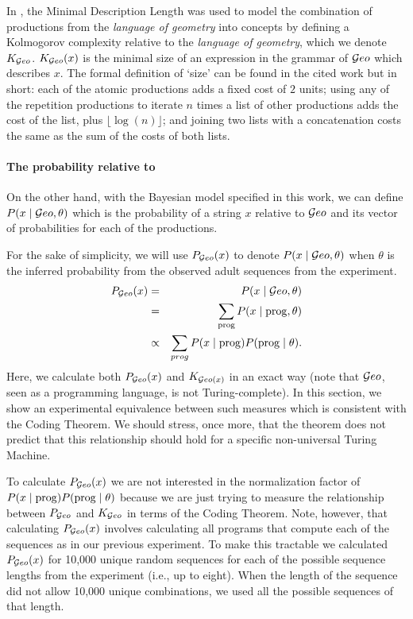 In \cite{marie2016}, the Minimal Description Length was used to model the combination of productions from the \textit{language of geometry} into concepts by defining a Kolmogorov complexity relative to the {\em language of geometry}, which we denote $K_{\mathcal Geo}$.
$K_{\mathcal Geo}(x)$ is the minimal size of an expression in the grammar of $\geom$ which describes $x$. The formal definition of `size' can be found in the cited work but in short: each of the atomic productions adds a fixed cost of $2$ units; using any of the repetition productions to iterate $n$ times a list of other productions adds the cost of the list, plus $\lfloor \log(n) \rfloor$; and joining two lists with a concatenation costs the same as the sum of the costs of both lists.

\paragraph{The probability relative to \boldmath{$\geom$}}
On the other hand, with the Bayesian model specified in this work, we can define $P(x \mid \mathcal Geo, \theta)$ which is the probability of a string $x$ relative to $\geom$ and its vector of probabilities for each of the productions.

For the sake of simplicity, we will use $P_{\mathcal Geo}(x)$ to denote $P(x \mid \mathcal Geo, \theta)$ when $\theta$ is the inferred probability from the observed adult sequences from the experiment.
%
\begin{eqnarray}
\label{eqG}
P_{\mathcal Geo}(x) &=& P(x \mid \mathcal Geo, \theta)\\
&=& \sum_{{\rm prog}} P(x \mid {\rm prog}, \theta)\\
&\propto &\sum_{prog} P(x \mid {\rm prog}) P({\rm prog} \mid \theta).
\end{eqnarray}
%
Here, we calculate both $P_{\mathcal Geo}(x)$ and $K_{\mathcal Geo(x)}$ in an exact way (note that $\geom$, seen as a programming language, is not Turing-complete). In this section, we show an experimental equivalence between such measures which is consistent with the Coding Theorem. We should stress, once more, that the theorem does not predict that this relationship should hold for a specific non-universal Turing Machine.


To calculate $P_{\mathcal Geo}(x)$ we are not interested in the normalization factor of $P(x \mid {\rm prog}) P({\rm prog} \mid \theta)$ because we are just trying to measure the relationship between $P_{\mathcal Geo}$ and $K_{\mathcal Geo}$ in terms of the Coding Theorem. Note, however, that calculating $P_{\mathcal Geo}(x)$ involves calculating all programs that compute each of the sequences as in our previous experiment. To make this tractable we calculated $P_{\mathcal Geo}(x)$ for 10,000 unique random sequences for each of the possible sequence lengths from the experiment (i.e., up to eight). When the length of the sequence did not allow 10,000 unique combinations, we used all the possible sequences of that length.

